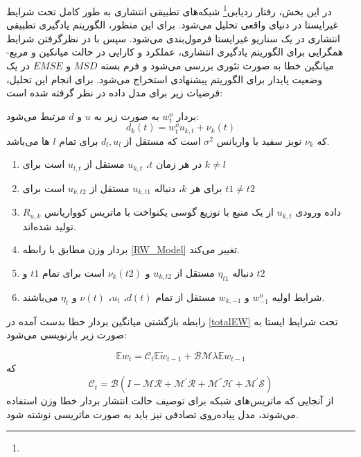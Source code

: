 در این بخش، رفتار ردیابی\footnote{} شبکه‌های تطبیقی انتشاری به طور کامل تحت شرایط غیرایستا در دنیای واقعی تحلیل می‌شود. برای این منظور، الگوریتم‌ یادگیری تطبیقی انتشاری در یک سناریو غیرایستا فرمول‌بندی می‌شود. سپس با در نظرگرفتن  شرایط همگرایی برای الگوریتم یادگیری انتشاری، عملکرد و کارایی در حالت میانکین و مربع-میانگین خطا به صورت تئوری بررسی می‌شود و فرم بسته $MSD$ و $EMSE$ در یک وضعیت پایدار برای الگوریتم پیشنهادی استخراج می‌شود. برای انجام این تحلیل، فرضیات زیر برای مدل داده در نظر گرفته شده است:

\begin{assumption}
	بردار $w^o_t$ به صورت زیر به $u$ و $d$ مرتبط می‌شود:
	\begin{equation}\label{nonsta_DModel}
		d_k (t)=w_t^o u_{k,t}+\nu_k (t)
	\end{equation}
که $\nu_k$ نویز سفید با واریانس $\sigma^2$ است که مستقل از ${d_l,u_l}$ برای تمام $l$ ها می‌باشد. 
	\begin{enumerate}
		\item 
در هر زمان $t$،		$u_{k,t}$ مستقل از $u_{l,t}$ است برای $k\neq l$
		\item
		برای هر $k$، دنباله $u_{k,t1}$ مستقل از $u_{k,t2}$ است برای $t1\ne t2$ 
		\item
		داده ورودی $u_{k,t}$ از یک منبع با توزیع گوسی یکنواخت با ماتریس کوواریانس $R_{u,k}$ تولید شده‌اند. 
		\item
		بردار وزن مطابق با رابطه \ref{RW_Model} تغییر می‌کند. 
		\item 
		دنباله $\eta_{t1}$ مستقل از $u_{k,t2}$ و $\nu_k(t2)$ است برای تمام $t1$ و $t2$
		\item 
		شرایط اولیه $w^o_{-1}$ و $w_{k,-1}$ مستقل از تمام $d(t)$، $u_t$، $\nu(t)$ و $\eta_t$ می‌باشند. 
	\end{enumerate}
\end{assumption}


رابطه بازگشتی میانگین بردار خطا بدست آمده در \ref{totalEW}  تحت شرایط ایستا به صورت زیر بازنویسی می‌شود:

\begin{equation}
	\mathbb{E}\hat{w}_t=\mathcal{C}_t\mathbb{E}\tilde{w}_{t-1}+\mathcal{B}\mathcal{M}\lambda \mathbb{E}w_{t-1}
\end{equation}
که 
\begin{equation}
	\mathcal{C}_t=\mathcal{B}(I-\mathcal{M}\mathcal{R}+\mathcal{M}^{'}\mathcal{R}+\mathcal{M}^{''}\mathcal{H}+\mathcal{M}^{'}\mathcal{S})
\end{equation}
از آنجایی که ماتریس‌های شبکه برای توصیف حالت انتشار بردار خطا وزن استفاده می‌شوند، مدل پیاده‌روی تصادفی نیز باید به صورت ماتریسی نوشته شود.


